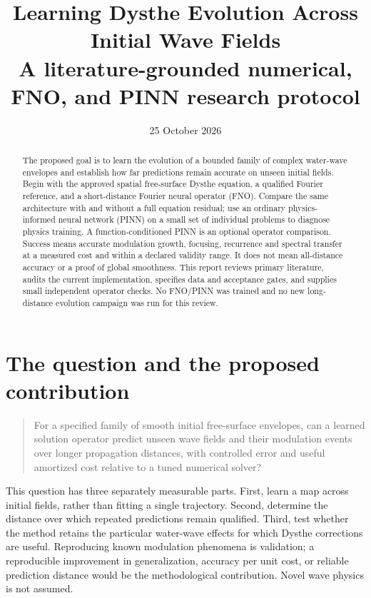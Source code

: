 \documentclass[11pt]{article}
\title{Learning Dysthe Evolution Across Initial Wave Fields\\
\large A literature-grounded numerical, FNO, and PINN research protocol}
\author{}
\date{25 October 2026}
\begin{document}
\maketitle
\begin{abstract}
The proposed goal is to learn the evolution of a bounded family of complex
water-wave envelopes and establish how far predictions remain accurate on
unseen initial fields. Begin with the approved spatial free-surface Dysthe
equation, a qualified Fourier reference, and a short-distance Fourier neural
operator (FNO). Compare the same architecture with and without a full
equation residual; use an ordinary physics-informed neural network (PINN)
on a small set of individual problems to diagnose physics training.
A function-conditioned PINN is an optional operator comparison.
Success means accurate modulation growth, focusing, recurrence and spectral
transfer at a measured cost and within a declared validity range.
It does not mean all-distance accuracy or a proof of global smoothness.
This report reviews primary literature, audits the current implementation,
specifies data and acceptance gates, and supplies small independent
operator checks. No FNO/PINN was trained and no new long-distance evolution
campaign was run for this review.
\end{abstract}

\section{The question and the proposed contribution}
\label{sec:goal}

\begin{quote}
For a specified family of smooth initial free-surface envelopes, can a
learned solution operator predict unseen wave fields and their modulation
events over longer propagation distances, with controlled error and useful
amortized cost relative to a tuned numerical solver?
\end{quote}

This question has three separately measurable parts. First, learn a map
across initial fields, rather than fitting a single trajectory. Second,
determine the distance over which repeated predictions remain qualified.
Third, test whether the method retains the particular water-wave effects
for which Dysthe corrections are useful. Reproducing known modulation
phenomena is validation; a reproducible improvement in generalization,
accuracy per unit cost, or reliable prediction distance would be the
methodological contribution. Novel wave physics is not assumed.
\end{document}
